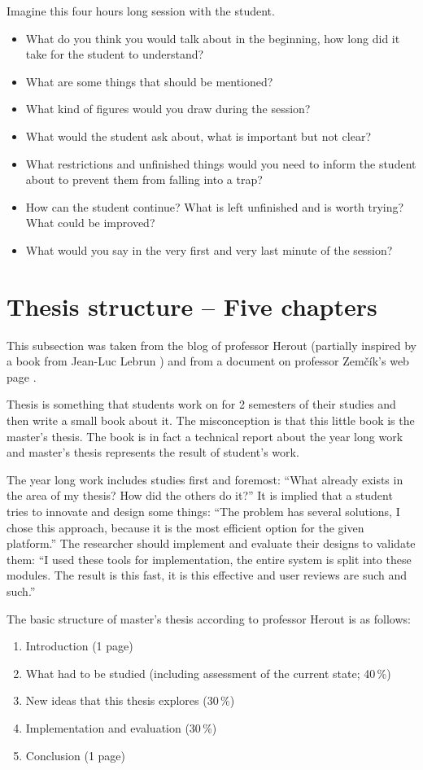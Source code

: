 Imagine this four hours long session with the student.
\begin{itemize}
  \item{What do you think you would talk about in the beginning, how long did it take for the student to understand?}
  \item{What are some things that should be mentioned?}
  \item{What kind of figures would you draw during the session?}
  \item{What would the student ask about, what is important but not clear?}
  \item{What restrictions and unfinished things would you need to inform the student about to prevent them from falling into a trap?}
  \item{How can the student continue? What is left unfinished and is worth trying? What could be improved?}
  \item{What would you say in the very first and very last minute of the session?}
\end{itemize}


\section{Thesis structure -- Five chapters}

This subsection was taken from the blog of professor Herout\cite{Herout} (partially inspired by a book from Jean-Luc Lebrun \cite{Lebrun2011}) and from a document on professor Zemčík's web page \cite{Zemcik}.
\bigskip

Thesis is something that students work on for 2 semesters of their studies and then write a small book about it. The misconception is that this little book is the master's thesis. The book is in fact a technical report about the year long work and master's thesis represents the result of student's work.

The year long work includes studies first and foremost: ``What already exists in the area of my thesis? How did the others do it?'' It is implied that a student tries to innovate and design some things: ``The problem has several solutions, I chose this approach, because it is the most efficient option for the given platform.''
The researcher should implement and evaluate their designs to validate them: ``I used these tools for implementation, the entire system is split into these modules. The result is this fast, it is this effective and user reviews are such and such.''

The basic structure of master's thesis according to professor Herout is as follows:
\begin{enumerate}
  \item{Introduction (1 page)}
  \item{What had to be studied (including assessment of the current state; 40\,\%)}
  \item{New ideas that this thesis explores (30\,\%)}
  \item{Implementation and evaluation (30\,\%)}
  \item{Conclusion (1 page)}
\end{enumerate}

